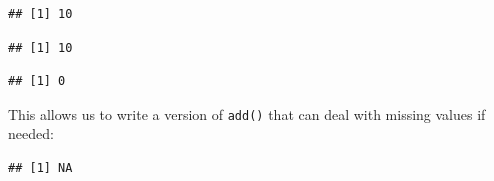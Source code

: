 \begin{verbatim}
## [1] 10
\end{verbatim}

\begin{Shaded}
\begin{Highlighting}[]
\NormalTok{(}\NormalTok{, }\NormalTok{, }\NormalTok{)}
\end{Highlighting}
\end{Shaded}

\begin{verbatim}
## [1] 10
\end{verbatim}

\begin{Shaded}
\begin{Highlighting}[]
\NormalTok{(}\NormalTok{, }\NormalTok{, }\NormalTok{)}
\end{Highlighting}
\end{Shaded}

\begin{verbatim}
## [1] 0
\end{verbatim}

This allows us to write a version of \texttt{add()} that can deal with
missing values if needed:

\begin{Shaded}
\begin{Highlighting}[]
\StringTok{ } \NormalTok{) \{}
  \OperatorTok{&&}\StringTok{ }\NormalTok{(}\OperatorTok{||}\StringTok{ }\NormalTok{) }\OperatorTok{+}\StringTok{ }
\NormalTok{\}}
\NormalTok{(}\NormalTok{, }\NormalTok{)}
\end{Highlighting}
\end{Shaded}

\begin{verbatim}
## [1] NA
\end{verbatim}

\begin{Shaded}
\begin{Highlighting}[]
\NormalTok{(}\NormalTok{, }\NormalTok{, } \NormalTok{)}
\end{Highlighting}
\end{Shaded}

